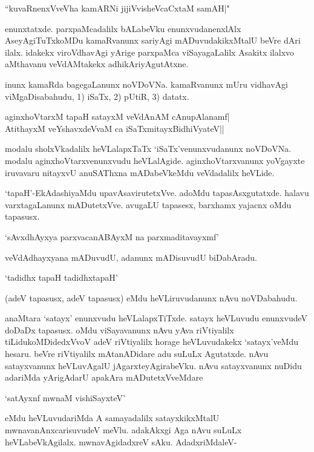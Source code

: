 \begin{shloka}
``kuvaRnenxVveVha kamARNi jijiVvisheVcaCxtaM samAH|"
\end{shloka}

enunxtatxde. parxpaMcadalilx bALabeVku enunxvudanenxlAlx AseyAgiTuTxkoMDu kamaRvanunx sariyAgi mADuvudakikxMtalU beVre dAri ilalx. idakekx viroVdhavAgi yArige parxpaMca viSayagaLalilx Asakitx ilalxvo aMthavanu veVdAMtakekx adhikAriyAgutAtxne.

inunx kamaRda bagegaLanunx noVDoVNa. kamaRvanunx mUru vidhavAgi viMgaDisabahudu, 1) iSaTx, 2) pUtiR, 3) datatx.

\begin{shloka}
aginxhoVtarxM tapaH satayxM veVdAnAM cAnupAlanamf|\\
AtithayxM veYshavxdeVvaM ca iSaTxmitayxBidhiVyateV||
\end{shloka}

modalu sholxVkadalilx heVLalapxTaTx `iSaTx'venunxvudanunx noVDoVNa. modalu aginxhoVtarxvenunxvudu heVLalAgide. aginxhoVtarxvanunx yoVgayxte iruvavaru nitayxvU anuSAThxna mADabeVkeMdu veVdadalilx heVLide.

`tapaH'-EkAdashiyaMdu upavAsavirutetxVve. adoMdu tapasAsxgutatxde. halavu varxtagaLanunx mADutetxVve. avugaLU tapasesx, barxhamx yajacnx oMdu tapasusx.

\begin{shloka}
`sAvxdhAyxya parxvacanABAyxM na parxmaditavayxmf'
\end{shloka}

veVdAdhayxyana mADuvudU, adanunx mADisuvudU biDabAradu.

\begin{shloka}
`tadidhx tapaH tadidhxtapaH'
\end{shloka}

(adeV tapasusx, adeV tapasusx) eMdu heVLiruvudanunx nAvu noVDabahudu.

anaMtara `satayx' enunxvudu heVLalapxTiTxde. satayx heVLuvudu enunxvudeV doDaDx tapasusx. oMdu viSayavanunx nAvu yAva riVtiyalilx tiLidukoMDidedxVvoV adeV riVtiyalilx horage heVLuvudakekx `satayx'veMdu hesaru. beVre riVtiyalilx mAtanADidare adu suLuLx Agutatxde. nAvu satayxvanunx heVLuvAgalU jAgarxteyAgirabeVku. nAvu satayxvanunx nuDidu adariMda yArigAdarU apakAra mADutetxVveMdare

\begin{shloka}
`satAyxnf mwnaM vishiSayxteV'
\end{shloka}

eMdu heVLuvudariMda A samayadalilx satayxkikxMtalU mwnavanAnxcarisuvudeV meVlu. adakAkxgi Aga nAvu suLuLx heVLabeVkAgilalx. mwnavAgidadxreV sAku. AdadxriMdaleV-

